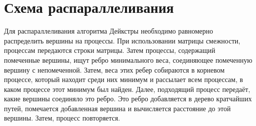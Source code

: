 \documentclass{report}
\begin{document}
\section*{Схема распараллеливания}
Для распараллеливания алгоритма Дейкстры необходимо равномерно распределить вершины на процессы. При использовании матрицы смежности, процессам передаются строки матрицы. Затем процессы, содержащий помеченные вершины, ищут ребро минимального веса, соединяющее помеченную вершину с непомеченной. Затем, веса этих ребер собираются в корневом процессе, который находит среди них минимум и рассылает всем процессам, в каком процессе этот минимум был найден. Далее, подходящий процесс передаёт, какие вершины соединяло это ребро. Это ребро добавляется в дерево кратчайших путей, помечается добавленная вершина и вычисляется расстояние до этой вершины. Затем, процесс повторяется.
\newpage

\end{document}
